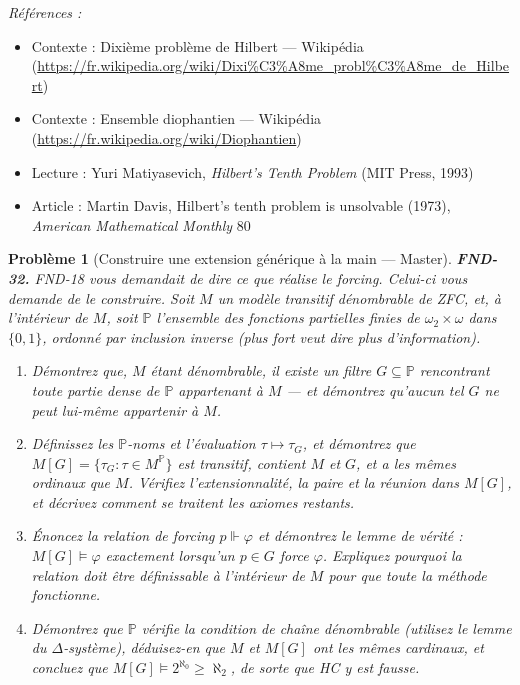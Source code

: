 \documentclass[11pt]{article}
\newtheorem{problem}{Problème}
\newenvironment{refs}{\par\small\noindent\emph{Références :}\begin{itemize}\setlength\itemsep{0pt}}{\end{itemize}\normalsize}
\begin{document}
\begin{refs}
\item Contexte : Dixième problème de Hilbert --- Wikipédia (\url{https://fr.wikipedia.org/wiki/Dixi%C3%A8me_probl%C3%A8me_de_Hilbert})
\item Contexte : Ensemble diophantien --- Wikipédia (\url{https://fr.wikipedia.org/wiki/Diophantien})
\item Lecture : Yuri Matiyasevich, \textit{Hilbert's Tenth Problem} (MIT Press, 1993)
\item Article : Martin Davis, \og{} Hilbert's tenth problem is unsolvable \fg{} (1973), \textit{American Mathematical Monthly} 80
\end{refs}

\bigskip

\begin{problem}[{Construire une extension générique à la main --- Master}]
\textbf{FND-32.} FND-18 vous demandait de dire ce que réalise le forcing. Celui-ci vous demande
de le construire. Soit $ M $ un modèle transitif dénombrable de ZFC, et, à l'intérieur de
$ M $, soit $ \mathbb{P} $ l'ensemble des fonctions partielles finies de
$ \omega_2 \times \omega $ dans $ \{0,1\} $, ordonné par inclusion inverse (plus fort veut dire
plus d'information).
\begin{enumerate}
\item[(a)] Démontrez que, $ M $ étant dénombrable, il existe un filtre $ G \subseteq \mathbb{P} $
rencontrant toute partie dense de $ \mathbb{P} $ appartenant à $ M $ --- et démontrez qu'aucun
tel $ G $ ne peut lui-même appartenir à $ M $.
\item[(b)] Définissez les $ \mathbb{P} $-noms et l'évaluation $ \tau \mapsto \tau_G $, et démontrez
que $ M[G] = \{ \tau_G : \tau \in M^{\mathbb{P}} \} $ est transitif, contient $ M $ et
$ G $, et a les mêmes ordinaux que $ M $. Vérifiez l'extensionnalité, la paire et la réunion
dans $ M[G] $, et décrivez comment se traitent les axiomes restants.
\item[(c)] Énoncez la relation de forcing $ p \Vdash \varphi $ et démontrez le lemme de vérité :
$ M[G] \models \varphi $ exactement lorsqu'un $ p \in G $ force $ \varphi $. Expliquez
pourquoi la relation doit être définissable à l'intérieur de $ M $ pour que toute la méthode
fonctionne.
\item[(d)] Démontrez que $ \mathbb{P} $ vérifie la condition de chaîne dénombrable (utilisez le lemme
du $ \Delta $-système), déduisez-en que $ M $ et $ M[G] $ ont les mêmes cardinaux, et
concluez que $ M[G] \models 2^{\aleph_0} \ge \aleph_2 $, de sorte que HC y est fausse.
\end{enumerate}

\end{problem}
\end{document}
